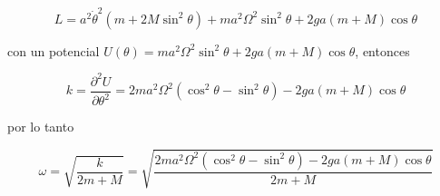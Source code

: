 \documentclass[12pt,a4paper]{article}
\begin{document}
\begin{enumerate}
\begin{equation*}
    L = a^2 \dot{\theta}^2 (m+2M\sin^2{\theta}) + ma^2 \Omega^2 \sin^2{\theta} + 2ga (m+M) \cos{\theta}
\end{equation*}

con un potencial $U(\theta) = ma^2 \Omega^2 \sin^2{\theta} + 2ga (m+M) \cos{\theta}$, entonces

\begin{equation*}
    k = \frac{\partial^2 U}{\partial \theta^2} = 2ma^2 \Omega^2 (\cos^2{\theta} - \sin^2{\theta}) - 2ga (m+M)\cos{\theta}
\end{equation*}

por lo tanto

\begin{equation*}
    \omega = \sqrt{\frac{k}{2m+M}} = \sqrt{\frac{2ma^2 \Omega^2 (\cos^2{\theta} - \sin^2{\theta}) - 2ga (m+M)\cos{\theta}}{2m + M}}
\end{equation*}












    
    
    

\end{enumerate}
\end{document}
